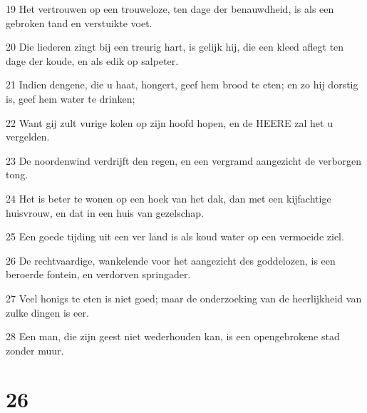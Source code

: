 \par 19 Het vertrouwen op een trouweloze, ten dage der benauwdheid, is als een gebroken tand en verstuikte voet.
\par 20 Die liederen zingt bij een treurig hart, is gelijk hij, die een kleed aflegt ten dage der koude, en als edik op salpeter.
\par 21 Indien dengene, die u haat, hongert, geef hem brood te eten; en zo hij dorstig is, geef hem water te drinken;
\par 22 Want gij zult vurige kolen op zijn hoofd hopen, en de HEERE zal het u vergelden.
\par 23 De noordenwind verdrijft den regen, en een vergramd aangezicht de verborgen tong.
\par 24 Het is beter te wonen op een hoek van het dak, dan met een kijfachtige huisvrouw, en dat in een huis van gezelschap.
\par 25 Een goede tijding uit een ver land is als koud water op een vermoeide ziel.
\par 26 De rechtvaardige, wankelende voor het aangezicht des goddelozen, is een beroerde fontein, en verdorven springader.
\par 27 Veel honigs te eten is niet goed; maar de onderzoeking van de heerlijkheid van zulke dingen is eer.
\par 28 Een man, die zijn geest niet wederhouden kan, is een opengebrokene stad zonder muur.

\chapter{26}

